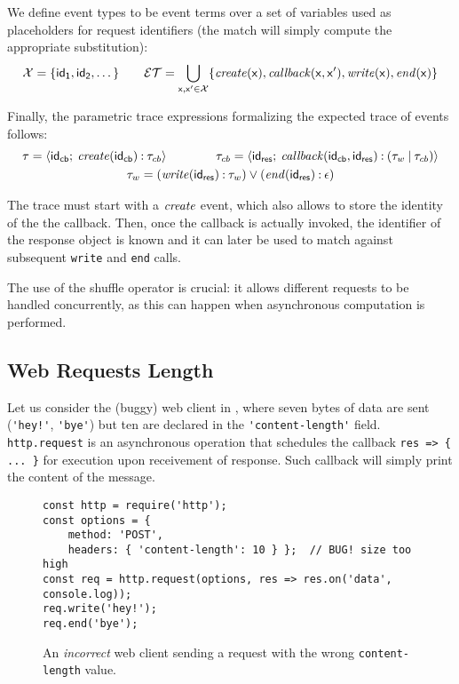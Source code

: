 We define event types to be event terms over a set of variables \vars used as placeholders for request identifiers (the match will simply compute the appropriate substitution):
\[ \mathcal{X} = \{ \mathsf{id_1}, \mathsf{id_2}, \dotsc \}\qquad
\mathcal{ET} = \bigcup_{\mathsf{x},\mathsf{x}' \in \mathcal{X}} \{\mathit{create}(\mathsf{x}), \mathit{callback}(\mathsf{x}, \mathsf{x}'), \mathit{write}(\mathsf{x}), \mathit{end}(\mathsf{x}) \} \]

Finally, the parametric trace expressions formalizing the expected trace of events follows:
\begin{gather*}
	\tau = {\langle}\mathsf{\mathsf{id_{cb}}{}};\:{\mathit{create}(\mathsf{id_{cb}}{}) \mathbin{:} \tau_{cb}}{\rangle} \qquad\qquad
	\tau_{cb} = {\langle}\mathsf{\mathsf{id_{res}}{}};\:{\mathit{callback}(\mathsf{id_{cb}}, \mathsf{id_{res}}) \mathbin{:} (\tau_w \mathbin{|} \tau_{cb})}{\rangle}\\
	\tau_w = (\mathit{write}(\mathsf{id_{res}}) \mathbin{:} \tau_w) \mathbin{\vee} (\mathit{end}(\mathsf{id_{res}}) \mathbin{:} \epsilon)
\end{gather*}

The trace must start with a \(\mathit{create}\) event, which also allows to store the identity of the the callback.
Then, once the callback is actually invoked, the identifier of the response object is known and it can later be used to match against subsequent \lstinline|write| and \lstinline|end| calls.

The use of the shuffle operator is crucial: it allows different requests to be handled concurrently, as this can happen when asynchronous computation is performed.

\subsection{Web Requests Length}
\label{sec:web-req}
Let us consider the (buggy) web client in , where seven bytes of data are sent (\lstinline{'hey!'}, \lstinline{'bye'}) but ten are declared in the \lstinline{'content-length'} field.
\lstinline{http.request} is an asynchronous operation that schedules the callback \lstinline!res => { ... }! for execution upon receivement of response.
Such callback will simply print the content of the message.

\begin{figure}[h]
\begin{lstlisting}
const http = require('http');
const options = {
	method: 'POST',
	headers: { 'content-length': 10 } };  // BUG! size too high
const req = http.request(options, res => res.on('data', console.log));
req.write('hey!');
req.end('bye');
\end{lstlisting}
\caption{An \emph{incorrect} web client sending a request with the wrong \texttt{content-length} value.}
\label{lst:client}
\end{figure}

